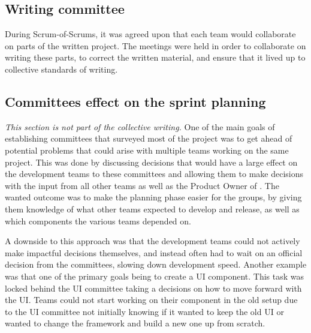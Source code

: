 \subsection{Writing committee}
During Scrum-of-Scrums, it was agreed upon that each team would collaborate on parts of the written project. The meetings were held in order to collaborate on writing these parts, to correct the written material, and ensure that it lived up to collective standards of writing.



\subsection{Committees effect on the sprint planning}
\textit{This section is not part of the collective writing.}
One of the main goals of establishing committees that surveyed most of the \knox{} project was to get ahead of potential problems that could arise with multiple teams working on the same project. 
This was done by discussing decisions that would have a large effect on the development teams to these committees and allowing them to make decisions with the input from all other  \knox{} teams as well as the Product Owner of \knox{}. 
The wanted outcome was to make the planning phase easier for the groups, by giving them knowledge of what other teams expected to develop and release, as well as which components the various teams depended on.

A downside to this approach was that the development teams could not actively make impactful decisions themselves, and instead often had to wait on an official decision from the committees, slowing down development speed. 
Another example was that one of the primary goals being to create a UI component. 
This task was locked behind the UI committee taking a decisions on how to move forward with the UI. 
Teams could not start working on their component in the old setup due to the UI committee not initially knowing if it wanted to keep the old UI or wanted to change the framework and build a new one up from scratch.


